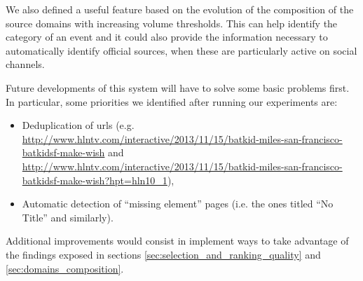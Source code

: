 \documentclass{sig-alternate}
\begin{document}
We also defined a useful feature based on the evolution of the composition of the source domains with increasing volume thresholds. This can help identify the category of an event and it could also provide the information necessary to automatically identify official sources, when these are particularly active on social channels.

Future developments of this system will have to solve some basic problems first. In particular, some priorities we identified after running our experiments are:
\begin{itemize}
  \item Deduplication of urls (e.g. \url{http://www.hlntv.com/interactive/2013/11/15/batkid-miles-san-francisco-batkidsf-make-wish} and \url{http://www.hlntv.com/interactive/2013/11/15/batkid-miles-san-francisco-batkidsf-make-wish?hpt=hln10_1}),
  \item Automatic detection of ``missing element'' pages (i.e. the ones titled ``No Title'' and similarly).
\end{itemize}
Additional improvements would consist in implement ways to take advantage of the findings exposed in sections \ref{sec:selection_and_ranking_quality} and \ref{sec:domains_composition}.

\nocite{*}


\balancecolumns
\end{document}
